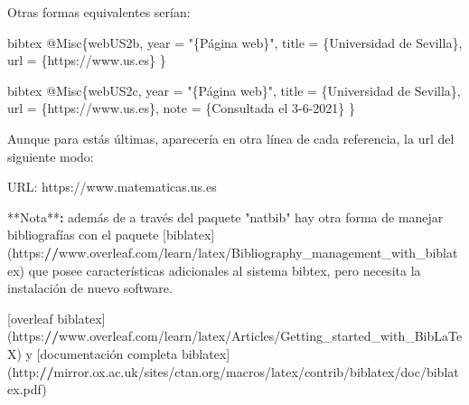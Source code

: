 \documentclass[11pt,a4paper,oneside,]{article}
\newenvironment{Shaded}{\begin{snugshade}}{\end{snugshade}}
\newcommand{\AttributeTok}[1]{\textcolor[rgb]{0.77,0.63,0.00}{#1}}
\newcommand{\ErrorTok}[1]{\textcolor[rgb]{0.64,0.00,0.00}{\textbf{#1}}}
\newcommand{\NormalTok}[1]{#1}
\newcommand{\SpecialCharTok}[1]{\textcolor[rgb]{0.00,0.00,0.00}{#1}}
\newcommand{\StringTok}[1]{\textcolor[rgb]{0.31,0.60,0.02}{#1}}
\numberwithin{dummy}{section}
\theoremstyle{ocrenumbox}
\theoremstyle{blacknumex}
\theoremstyle{blacknumbox}
\theoremstyle{ocrenum}
\theoremstyle{ocrenum}
\begin{document}
\begin{Shaded}
\begin{Highlighting}[numbers=left,,firstnumber=1101,]
\StringTok{\textasciigrave{}\textasciigrave{}\textasciigrave{}}

\NormalTok{Otras formas equivalentes serían}\SpecialCharTok{:}

\StringTok{\textasciigrave{}\textasciigrave{}\textasciigrave{}}\AttributeTok{bibtex}
\AttributeTok{@Misc\{webUS2b,}
\AttributeTok{  year = "\{Página web\}",}
\AttributeTok{  title = \{Universidad de Sevilla\},}
\AttributeTok{  url = \{https://www.us.es\}}
\AttributeTok{\}}
\StringTok{\textasciigrave{}\textasciigrave{}\textasciigrave{}}

\StringTok{\textasciigrave{}\textasciigrave{}\textasciigrave{}}\AttributeTok{bibtex}
\AttributeTok{@Misc\{webUS2c,}
\AttributeTok{  year = "\{Página web\}",}
\AttributeTok{  title = \{Universidad de Sevilla\},}
\AttributeTok{  url = \{https://www.us.es\},}
\AttributeTok{  note = \{Consultada el 3{-}6{-}2021\}}
\AttributeTok{\}}
\StringTok{\textasciigrave{}\textasciigrave{}\textasciigrave{}}

\NormalTok{Aunque para estás últimas, aparecería en otra línea de cada referencia, la url del siguiente modo}\SpecialCharTok{:}

\StringTok{\textasciigrave{}\textasciigrave{}\textasciigrave{}}
\AttributeTok{URL: https://www.matematicas.us.es}
\StringTok{\textasciigrave{}\textasciigrave{}\textasciigrave{}}







\SpecialCharTok{**}\NormalTok{Nota}\SpecialCharTok{**}\ErrorTok{:}\NormalTok{ además de a través del paquete }\StringTok{"natbib"}\NormalTok{ hay otra forma de manejar bibliografías  con el paquete [biblatex](https}\SpecialCharTok{:}\ErrorTok{//}\NormalTok{www.overleaf.com}\SpecialCharTok{/}\NormalTok{learn}\SpecialCharTok{/}\NormalTok{latex}\SpecialCharTok{/}\NormalTok{Bibliography\_management\_with\_biblatex) que posee características adicionales al sistema bibtex, pero necesita la instalación de nuevo software.}

\NormalTok{[overleaf biblatex](https}\SpecialCharTok{:}\ErrorTok{//}\NormalTok{www.overleaf.com}\SpecialCharTok{/}\NormalTok{learn}\SpecialCharTok{/}\NormalTok{latex}\SpecialCharTok{/}\NormalTok{Articles}\SpecialCharTok{/}\NormalTok{Getting\_started\_with\_BibLaTeX) y [documentación completa biblatex](http}\SpecialCharTok{:}\ErrorTok{//}\NormalTok{mirror.ox.ac.uk}\SpecialCharTok{/}\NormalTok{sites}\SpecialCharTok{/}\NormalTok{ctan.org}\SpecialCharTok{/}\NormalTok{macros}\SpecialCharTok{/}\NormalTok{latex}\SpecialCharTok{/}\NormalTok{contrib}\SpecialCharTok{/}\NormalTok{biblatex}\SpecialCharTok{/}\NormalTok{doc}\SpecialCharTok{/}\NormalTok{biblatex.pdf)}



\end{Highlighting}
\end{Shaded}
\end{document}
